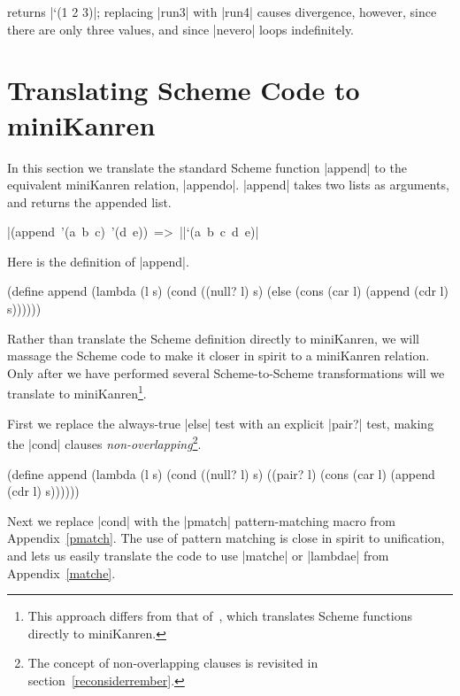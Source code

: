 \noindent returns \schemeresult|`(1 2 3)|; replacing \scheme|run3|
with \scheme|run4| causes divergence, however, since there are only
three values, and since \scheme|nevero| loops indefinitely.

\section{Translating Scheme Code to miniKanren}\label{transappendosection}

In this section we translate the standard Scheme function
\scheme|append| to the equivalent miniKanren relation,
\scheme|appendo|.  \scheme|append| takes two lists as arguments, and
returns the appended list.

\wspace

\noindent\mbox{\scheme|(append '(a b c) '(d e)) => |}\mbox{\schemeresult|`(a b c d e)|}

\wspace

Here is the definition of \mbox{\scheme|append|}.

\schemedisplayspace
\begin{schemedisplay}
(define append
  (lambda (l s)
    (cond
      ((null? l) s)
      (else (cons (car l) (append (cdr l) s))))))
\end{schemedisplay}

Rather than translate the Scheme definition directly to miniKanren, we
will massage the Scheme code to make it closer in spirit to a
miniKanren relation. Only after we have performed several
Scheme-to-Scheme transformations will we translate to
miniKanren\footnote{This approach differs from that of~\cite{trs},
  which translates Scheme functions directly to miniKanren.}.

First we replace the always-true \scheme|else| test with an explicit
\scheme|pair?| test, making the \scheme|cond| clauses
\emph{non-overlapping}\footnote{The concept of non-overlapping clauses
  is revisited in section~\ref{reconsiderrember}.}.

\newpage

\begin{schemedisplay}
(define append
  (lambda (l s)
    (cond
      ((null? l) s)
      ((pair? l) (cons (car l) (append (cdr l) s))))))
\end{schemedisplay}

Next we replace \scheme|cond| with the \scheme|pmatch|
pattern-matching macro from Appendix~\ref{pmatch}.  The use of pattern
matching is close in spirit to unification, and lets us easily
translate the code to use \scheme|matche| or \scheme|lambdae| from
Appendix~\ref{matche}.

